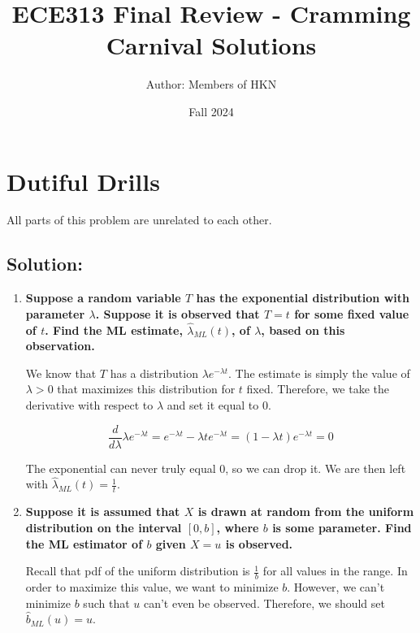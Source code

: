 \documentclass{article}
\title{ECE313 Final Review - Cramming Carnival Solutions}
\author{Author: Members of HKN}
\date{Fall 2024}
\begin{document}
\maketitle


\section{Dutiful Drills}

All parts of this problem are unrelated to each other.

\subsection{Solution:}

\begin{enumerate}[label=(\alph*)]
\itemsep0em
    \item \textbf{Suppose a random variable $T$ has the exponential distribution with parameter $\lambda$. Suppose it is observed that $T = t$ for some fixed value of $t$. Find the ML estimate, $\hat{\lambda}_{ML}(t)$, of $\lambda$, based on this observation.}

    We know that $T$ has a distribution $\lambda e^{-\lambda t}$. The estimate is simply the value of $\lambda > 0$ that maximizes this distribution for $t$ fixed. Therefore, we take the derivative with respect to $\lambda$ and set it equal to $0$.

    $$\frac{d}{d\lambda} \lambda e^{-\lambda t} = e^{-\lambda t} - \lambda te^{-\lambda t} = (1 - \lambda t)e^{-\lambda t} = 0$$

    The exponential can never truly equal $0$, so we can drop it. We are then left with $\boxed{\hat{\lambda}_{ML}(t) = \frac{1}{t}}$.

    \vspace{3cm}
    
    \item \textbf{Suppose it is assumed that $X$ is drawn at random from the uniform distribution on the interval $[0, b]$, where $b$ is some parameter. Find the ML estimator of $b$ given $X = u$ is observed.}

    Recall that pdf of the uniform distribution is $\frac{1}{b}$ for all values in the range. In order to maximize this value, we want to minimize $b$. However, we can't minimize $b$ such that $u$ can't even be observed. Therefore, we should set $\boxed{\hat{b}_{ML}(u) = u}$.

    \vspace{3cm}
    

\end{enumerate}
\end{document}
